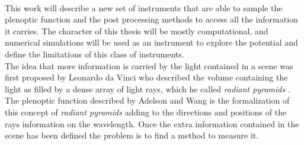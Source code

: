 \\
This work will describe a new set of instruments that are able to sample the plenoptic function and the post processing methods to access all the information it carries. The character of this thesis will be mostly computational, and numerical simulations will be used as an instrument to explore the potential and define the limitations of this class of instruments.
\\
 The idea that more information is carried by the light contained in a scene was first proposed by Leonardo da Vinci who described the volume containing the light as filled by a dense array of light rays, which he called \textit{radiant pyramids} \cite{adelson1991plenoptic}. The plenoptic function described by Adelson and Wang \cite{adelson1991plenoptic} is the formalization of this concept of \textit{radiant pyramids} adding to the directions and positions of the rays information on the wavelength. Once the extra information contained in the scene has been defined the problem is to find a method to measure it. \\
